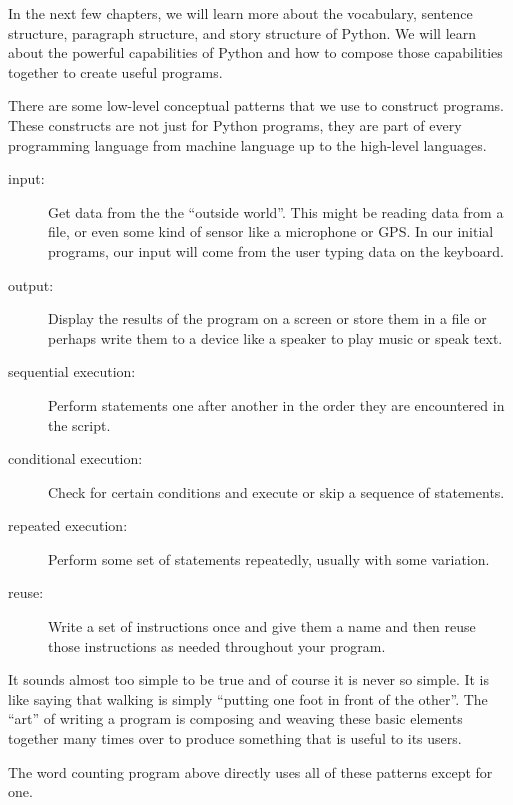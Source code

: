 \documentclass[11pt]{book}
\begin{document}
In the next few chapters, we will learn more about the vocabulary, sentence structure,
paragraph structure, and story structure of Python.  We will learn about the powerful
capabilities of Python and how to compose those capabilities together to create useful
programs.

There are some low-level conceptual patterns that we use to construct programs.  These
constructs are not just for Python programs, they are part of every programming language
from machine language up to the high-level languages.

\begin{description}

\item[input:] Get data from the the ``outside world''.  This might be 
reading data from a file, or even some kind of sensor like 
a microphone or GPS.  In our initial programs, our input will come from the user
typing data on the keyboard.

\item[output:] Display the results of the program on a screen
or store them in a file or perhaps write them to a device like a
speaker to play music or speak text.

\item[sequential execution:] Perform statements one after
another in the order they are encountered in the script.

\item[conditional execution:] Check for certain conditions and
execute or skip a sequence of statements.

\item[repeated execution:] Perform some set of statements 
repeatedly, usually with
some variation.

\item[reuse:] Write a set of instructions once and give them a name
and then reuse those instructions as needed throughout your program.

\end{description}

It sounds almost too simple to be true and of course it is never
so simple.  It is like saying that walking is simply
``putting one foot in front of the other''.  The ``art'' 
of writing a program is composing and weaving these
basic elements together many times over to produce something
that is useful to its users.

The word counting program above directly uses all of 
these patterns except for one.
\end{document}
